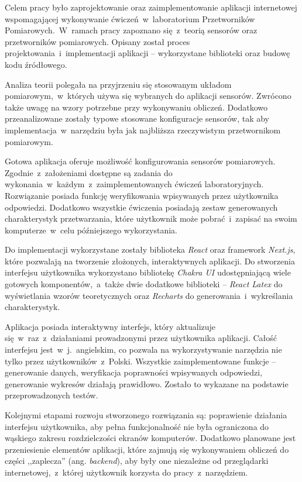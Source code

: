 Celem pracy było zaprojektowanie oraz zaimplementowanie aplikacji internetowej wspomagającej
wykonywanie ćwiczeń~w~laboratorium Przetworników Pomiarowych.~W~ramach pracy zapoznano się~z~teorią
sensorów oraz przetworników pomiarowych. Opisany został proces projektowania~i~implementacji
aplikacji -- wykorzystane biblioteki oraz budowę kodu źródłowego.

Analiza teorii polegała na przyjrzeniu się stosowanym układom pomiarowym,~w~których używa się
wybranych do aplikacji sensorów. Zwrócono także uwagę na wzory potrzebne przy wykonywaniu obliczeń.
Dodatkowo przeanalizowane zostały typowe stosowane konfiguracje sensorów, tak aby
implementacja~w~narzędziu była jak najbliższa rzeczywistym przetwornikom pomiarowym.

Gotowa aplikacja oferuje możliwość konfigurowania sensorów pomiarowych. Zgodnie~z~założeniami
dostępne są zadania do wykonania~w~każdym~z~zaimplementowanych ćwiczeń laboratoryjnych. Rozwiązanie
posiada funkcję weryfikowania wpisywanych przez użytkownika odpowiedzi. Dodatkowo wszystkie
ćwiczenia posiadają zestaw generowanych charakterystyk przetwarzania, które użytkownik może
pobrać~i~zapisać na swoim komputerze~w~celu późniejszego wykorzystania.

Do implementacji wykorzystane zostały biblioteka \textit{React} oraz framework \textit {Next.js},
które pozwalają na tworzenie złożonych, interaktywnych aplikacji. Do stworzenia interfejsu
użytkownika wykorzystano bibliotekę \textit{Chakra UI} udostępniającą wiele gotowych
komponentów,~a~także dwie dodatkowe biblioteki -- \textit{React Latex} do wyświetlania wzorów
teoretycznych oraz \textit{Recharts} do generowania~i~wykreślania charakterystyk.

Aplikacja posiada interaktywny interfejs, który aktualizuje się~w~raz~z~działaniami prowadzonymi
przez użytkownika aplikacji. Całość interfejsu jest~w~j.~angielskim, co pozwala na wykorzystywanie
narzędzia nie tylko przez użytkowników~z~Polski. Wszystkie zaimplementowane funkcje -- generowanie
danych, weryfikacja poprawności wpisywanych odpowiedzi, generowanie wykresów działają prawidłowo.
Zostało to wykazane na podstawie przeprowadzonych testów.

Kolejnymi etapami rozwoju stworzonego rozwiązania są: poprawienie działania interfejsu użytkownika,
aby pełna funkcjonalność nie była ograniczona do wąskiego zakresu rozdzielczości ekranów
komputerów. Dodatkowo planowane jest przeniesienie elementów aplikacji, które zajmują się
wykonywaniem obliczeń do części ,,zaplecza'' (ang. \textit{backend}), aby były one niezależne od
przeglądarki internetowej,~z~której użytkownik korzysta do pracy~z~narzędziem.